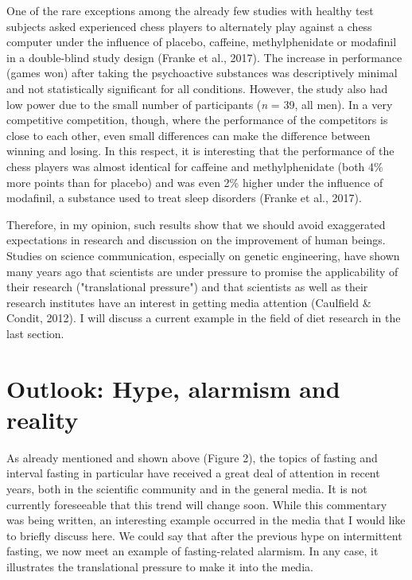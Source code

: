 \documentclass[authordate, empirical]{jote-new-article}
\begin{document}
One of the rare exceptions among the already few studies with healthy test subjects asked experienced chess players to alternately play against a chess computer under the influence of placebo, caffeine, methylphenidate or modafinil in a double-blind study design (Franke et al., 2017). The increase in performance (games won) after taking the psychoactive substances was descriptively minimal and not statistically significant for all conditions. However, the study also had low power due to the small number of participants (\emph{n }= 39, all men). In a very competitive competition, though, where the performance of the competitors is close to each other, even small differences can make the difference between winning and losing. In this respect, it is interesting that the performance of the chess players was almost identical for caffeine and methylphenidate (both 4\% more points than for placebo) and was even 2\% higher under the influence of modafinil, a substance used to treat sleep disorders (Franke et al., 2017).







Therefore, in my opinion, such results show that we should avoid exaggerated expectations in research and discussion on the improvement of human beings. Studies on science communication, especially on genetic engineering, have shown many years ago that scientists are under pressure to promise the applicability of their research ("translational pressure") and that scientists as well as their research institutes have an interest in getting media attention (Caulfield \& Condit, 2012). I will discuss a current example in the field of diet research in the last section.







\section{Outlook: Hype, alarmism and reality}







As already mentioned and shown above (Figure 2), the topics of fasting and interval fasting in particular have received a great deal of attention in recent years, both in the scientific community and in the general media. It is not currently foreseeable that this trend will change soon. While this commentary was being written, an interesting example occurred in the media that I would like to briefly discuss here. We could say that after the previous hype on intermittent fasting, we now meet an example of fasting-related alarmism. In any case, it illustrates the translational pressure to make it into the media.
\end{document}
